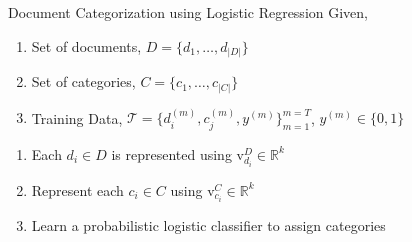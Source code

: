 \documentclass[10pt]{beamer}
\newcommand{\setD}{\ensuremath{D} }
\newcommand{\setC}{\ensuremath{C} }
\newcommand{\matD}{\ensuremath{\mathrm{D}} }
\newcommand{\matC}{\ensuremath{\mathrm{C}} }
\newcommand{\vecdi}[1]{\ensuremath{\mathrm{v}^{D}_{#1}}}
\newcommand{\vecci}[1]{\ensuremath{\mathrm{v}^{C}_{#1}}}
\newcommand{\traindata}{\ensuremath{\mathcal{T}}}
\begin{document}

\begin{frame}{Document Categorization using Logistic Regression}
Given,
\begin{enumerate}
	\vfill\item<1-> Set of documents, $\setD = \{d_{1}, \ldots, d_{|\setD|}\}$
	\vfill\item<2-> Set of categories, $\setC = \{c_{1}, \ldots, c_{|\setC|}\}$
	\vfill\item<3-> Training Data, $\traindata = \{ d^{(m)}_{i}, c^{(m)}_{j}, y^{(m)}\}^{m=T}_{m=1}$, $y^{(m)} \in \{0,1\}$
\end{enumerate}

\vfill{}

\begin{enumerate}
	\vfill\item<5-> Each $d_{i} \in \setD$ is represented using $\vecdi{d_{i}} \in \mathbb{R}^{k}$
	\vfill\item<6-> Represent each $c_{i} \in \setC$ using $\vecci{c_{i}} \in \mathbb{R}^{k}$
	\vfill\item<7-> Learn a probabilistic logistic classifier to assign categories
\end{enumerate}

\end{frame}

\end{document}
